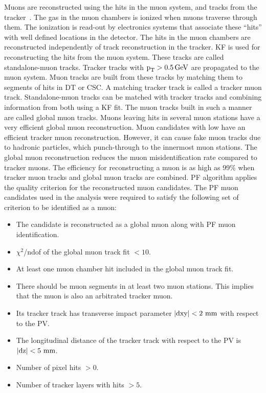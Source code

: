 Muons are reconstructed using the hits in the muon system, and tracks from the tracker~\cite{Sirunyan:2018fpa}. The gas in the muon chambers is ionized when muons traverse through them. The ionization is read-out by electronics systems that associate these ``hits'' with well defined locations in the detector. The hits in the muon chambers are reconstructed independently of track reconstruction in the tracker. KF is used for reconstructing the hits from the muon system. These tracks are called standalone-muon tracks. Tracker tracks with $\text{p}_\text{T} > 0.5 \,\text{Ge\hspace{-.08em}V}$ are propagated to the muon system. Muon tracks are built from these tracks by matching them to segments of hits in DT or CSC. A matching tracker track is called a tracker muon track. Standalone-muon tracks can be matched with tracker tracks and combining information from both using a KF fit. The muon tracks built in such a manner are called global muon tracks. Muons leaving hits in several muon stations have a very efficient global muon reconstruction. Muon candidates with low \pt have an efficient tracker muon reconstruction. However, it can cause fake muon tracks due to hadronic particles, which punch-through to the innermost muon stations. The global muon reconstruction reduces the muon misidentification rate compared to tracker muons. The efficiency for reconstructing a muon is as high as 99\% when tracker muon tracks and global muon tracks are combined. PF algorithm applies the quality criterion for the reconstructed muon candidates. The PF muon candidates used in the analysis were required to satisfy the following set of criterion to be identified as a muon:

\begin{itemize}
  \item The candidate is reconstructed as a global muon along with PF muon identification.
  \item $\chi^{2}$/ndof of the global muon track fit $< 10$.
  \item At least one muon chamber hit included in the global muon track fit.
  \item There should be muon segments in at least two muon stations. This implies that the muon is also an arbitrated tracker muon.
  \item Its tracker track has transverse impact parameter $|\text{dxy}| < 2~\text{mm}$ with respect to the PV.
  \item The longitudinal distance of the tracker track with respect to the PV is $|\text{dz}| < 5~\text{mm}$.
  \item Number of pixel hits $> 0$.
  \item Number of tracker layers with hits $> 5$.
\end{itemize}

